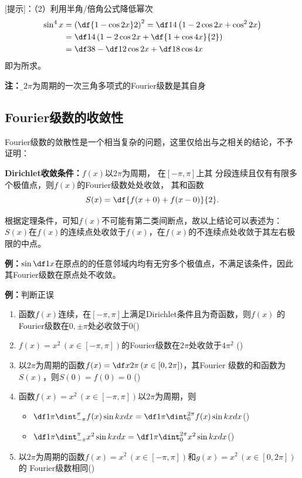 [提示]：（2）利用半角/倍角公式降低幂次
\begin{align*}
	\sin^4x&=\left(\df{1-\cos2x}2\right)^2
	=\df14\left(1-2\cos2x+\cos^22x\right)\\
	&=\df14\left(1-2\cos2x+\df{1+\cos4x}{2}\right)\\
	&=\df38-\df12\cos2x+\df18\cos4x
\end{align*}
即为所求。

{\bf 注：}{\b 以$2\pi$为周期的一次三角多项式的Fourier级数是其自身}

\subsection{Fourier级数的收敛性}

Fourier级数的敛散性是一个相当复杂的问题，这里仅给出与之相关的结论，不予证明：

\begin{thx}
	{\bf Dirichlet收敛条件：}$f(x)$以$2\pi$为周期， 在$[-\pi,\pi]$上其
	分段连续且仅有有限多个极值点，则$f(x)$的Fourier级数处处收敛，
	 其和函数
	$$S(x) =\df{f(x+0)+f(x-0)}{2}.$$
\end{thx}

根据定理条件，可知$f(x)$不可能有第二类间断点，故以上结论可以表述为：
$S(x)$在$f(x)$的连续点处收敛于$f(x)$，在$f(x)$的不连续点处收敛于其左右极限的中点。

{\bf 例：}$\sin\df1x$在原点的的任意邻域内均有无穷多个极值点，不满足该条件，因此
其Fourier级数在原点处不收敛。

{\bf 例：}判断正误
\begin{enumerate}[(1)]
  \setlength{\itemindent}{1cm}
  \item 函数$f(x)$连续，在$[-\pi,\pi]$上满足Dirichlet条件且为奇函数，则$f(x)$
  的Fourier级数在$0,\pm\pi$处必收敛于$0$\quad  (\;{$\surd$}\;) 
  \item $f(x)=x^2\,(x\in[-\pi,\pi])$的Fourier级数在$2\pi$处收敛于$4\pi^2$
    \quad(\;{$\times$}\;) 
  \item 以$2\pi$为周期的函数$f(x)=\df x{2\pi}\,(x\in[0,2\pi])$，其Fourier
  级数的和函数为$S(x)$，则$S(0)=f(0)=0$ 
  \quad (\;{$\times$}\;)
  \item 函数$f(x)=x^2\,(x\in[-\pi,\pi])$以$2\pi$为周期，则 
  \begin{itemize}
    \item $\df 1{\pi}\dint_{-\pi}^{\pi}f(x)\sin kxdx=\df
    1{\pi}\dint_{0}^{2\pi}f(x)\sin kxdx$\quad (\;{$\surd$}\;) 
    \item $\df 1{\pi}\dint_{-\pi}^{\pi}x^2\sin kxdx=\df
    1{\pi}\dint_{0}^{2\pi}x^2\sin kxdx$\quad (\;{$\times$}\;) 
  \end{itemize}
  \item 以$2\pi$为周期的函数$f(x)=x^2\,(x\in[-\pi,\pi])$和$g(x)=x^2\,(x\in[0,2\pi])$的
  Fourier级数相同\quad (\;{$\times$}\;)
\end{enumerate}

